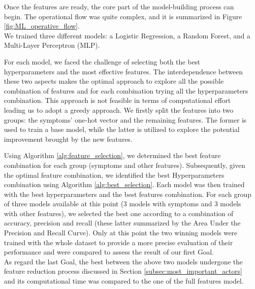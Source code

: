 Once the features are ready, the core part of the model-building process can begin. The operational flow was quite complex,
and it is summarized in Figure \ref{fig:ML_operative_flow}.\\
We trained three different models: a Logistic Regression, a Random Forest, and a Multi-Layer Perceptron (MLP).

For each model, we faced the challenge of selecting both the best hyperparameters and the most effective features. 
The interdependence between these two aspects makes the optimal approach to explore all the possible combination of features
and for each combination trying all the hyperparameters combination. This approach is not feasible in terms of computational effort
leading us to adopt a greedy approach. We firstly split the features into two 
groups: the symptoms' one-hot vector and the remaining features. The former is used to train a base model, 
while the latter is utilized to explore the potential improvement brought by the new features.

Using Algorithm \ref{alg:feature_selection}, we determined the best feature combination for each group (symptoms and other features).
Subsequently, given the optimal feature combination, we identified the best Hyperparameters combination using Algorithm 
\ref{alg:best_selection}. Each model was then trained with the best hyperparameters and the best features combination. 
For each group of three models available at this point (3 models with symptoms and 3 models with other features), we selected the best one
according to a combination of accuracy, precision and recall (these latter summarized by the Area Under the Precision and Recall Curve).
Only at this point the two winning models were trained with the whole dataset to provide a more precise evaluation of their performance and
were compared to assess the result of our first Goal.\\
As regard the last Goal, the best between the above two models undergone the feature reduction process 
discussed in Section \ref{subsec:most_important_actors} and its computational time was compared to the one of the full features model.\\



